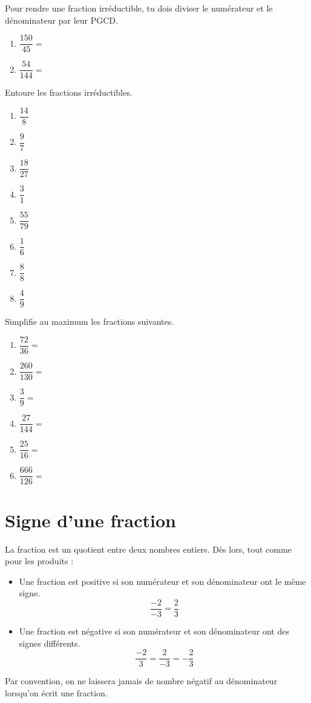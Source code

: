 \documentclass[../math2.tex]{subfiles}
\begin{document}

Pour rendre une fraction irréductible, tu dois diviser le numérateur et le dénominateur par leur PGCD.

\exemples
\begin{enumerate}[itemsep = 2 em]
  \item $\dfrac{150}{45}=$
  \item $\dfrac{54}{144} =$
\end{enumerate}

\newpage
\begin{exercise}
  Entoure les fractions irréductibles.
  \begin{enumerate}[label=,cols=4]
    \item $\dfrac{14}{8}$
    \item $\dfrac{9}{7}$
    \item $\dfrac{18}{27}$
    \item $\dfrac{3}{1}$
    \item $\dfrac{55}{79}$
    \item $\dfrac{1}{6}$
    \item $\dfrac{8}{8}$
    \item $\dfrac{4}{9}$
  \end{enumerate}
\end{exercise}

\begin{exercise}
  Simplifie au maximum les fractions suivantes.
  \begin{enumerate}[cols=3, itemsep=2.5 cm]
    \item $\dfrac{72}{36}=$
    \item $\dfrac{260}{130}=$
    \item $\dfrac{3}{9}=$
    \item $\dfrac{27}{144}=$
    \item $\dfrac{25}{16}=$
    \item $\dfrac{666}{126}=$
  \end{enumerate}
  \vspace*{1cm}
\end{exercise}

\section{Signe d'une fraction}
La fraction est un quotient entre deux nombres entiers. Dès lors, tout comme pour les produits :
\begin{itemize}
  \item[\faIcon{plus-square}] Une fraction est positive si son numérateur et son dénominateur ont le même signe.
    \[\dfrac{-2}{-3} = \dfrac{2}{3}\]
  \item[\faIcon{minus-square}] Une fraction est négative si son numérateur et son dénominateur ont des signes différents.
    \[\dfrac{-2}{3} = \dfrac{2}{-3} = -\dfrac{2}{3}\]
\end{itemize}
\smallbreak
{} Par convention, on ne laissera jamais de nombre négatif au dénominateur lorsqu'on écrit une fraction.
\end{document}
